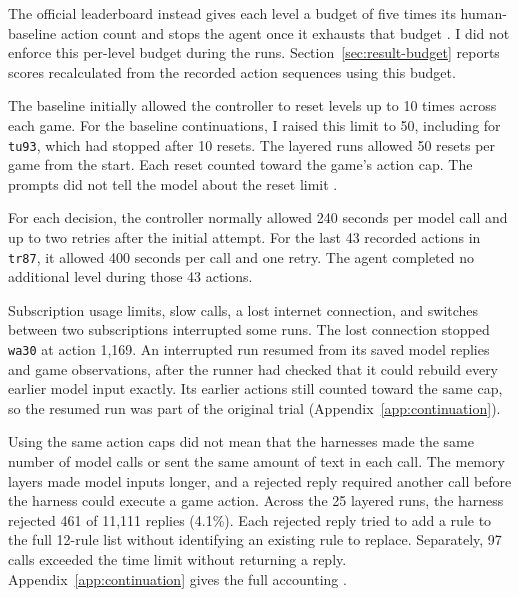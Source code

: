 The official leaderboard instead gives each level a budget of five times its human-baseline action count and stops the agent once it exhausts that budget \citep{arc2026technical}. I did not enforce this per-level budget during the runs. Section~\ref{sec:result-budget} reports scores recalculated from the recorded action sequences using this budget.

The baseline initially allowed the controller to reset levels up to 10 times across each game. For the baseline continuations, I raised this limit to 50, including for \texttt{tu93}, which had stopped after 10 resets. The layered runs allowed 50 resets per game from the start. Each reset counted toward the game's action cap. The prompts did not tell the model about the reset limit \citep{dai2026continuationfinal}.

For each decision, the controller normally allowed 240 seconds per model call and up to two retries after the initial attempt. For the last 43 recorded actions in \texttt{tr87}, it allowed 400 seconds per call and one retry. The agent completed no additional level during those 43 actions.

Subscription usage limits, slow calls, a lost internet connection, and switches between two subscriptions interrupted some runs. The lost connection stopped \texttt{wa30} at action 1,169. An interrupted run resumed from its saved model replies and game observations, after the runner had checked that it could rebuild every earlier model input exactly. Its earlier actions still counted toward the same cap, so the resumed run was part of the original trial (Appendix~\ref{app:continuation}).

Using the same action caps did not mean that the harnesses made the same number of model calls or sent the same amount of text in each call. The memory layers made model inputs longer, and a rejected reply required another call before the harness could execute a game action. Across the 25 layered runs, the harness rejected 461 of 11,111 replies (4.1\%). Each rejected reply tried to add a rule to the full 12-rule list without identifying an existing rule to replace. Separately, 97 calls exceeded the time limit without returning a reply. Appendix~\ref{app:continuation} gives the full accounting \citep{dai2026logcounts,dai2026wholeverify}.
